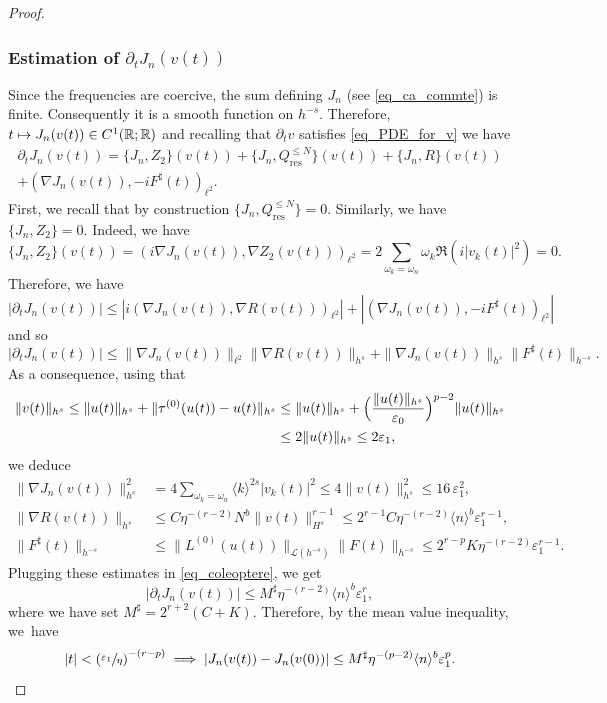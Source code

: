 \documentclass[11pt]{article}
\newcommand\mto{\mathchoice{\longmapsto}{\mapsto}{\mapsto}{\mapsto}}
\theoremstyle{definition}
\begin{document}
\begin{proof}
\subsubsection*{Estimation of $\partial_t J_n(v(t))$}
Since the frequencies are coercive, the sum defining $J_n$ (see \eqref{eq_ca_commte}) is finite. Consequently it is a smooth function on $h^{-s}$. Therefore, $t\mto J_n(v(t)) \in C^1(\mathbb{R};\mathbb{R})$ and recalling that $\partial_t v$ satisfies \eqref{eq_PDE_for_v} we have
\begin{multline*}
\partial_t J_n(v(t)) = \{J_n, Z_2 \}(v(t))+ \{J_n, Q^{\leq N}_{\mathrm{res}} \}(v(t)) + \{J_n, R \}(v(t)) \\+ (\nabla J_n(v(t)),-i F^\sharp(t))_{\ell^2}.
\end{multline*}
First, we recall that by construction $\{J_n, Q^{\leq N}_{\mathrm{res}} \}=0$. Similarly, we have $\{J_n, Z_2 \}=0$. Indeed, we have
\[
\{J_n, Z_2 \}(v(t)) = (i\nabla J_n(v(t)), \nabla Z_2(v(t)))_{\ell^2}=2 \sum_{\omega_k = \omega_n} \omega_k \Re (i |v_k(t)|^2) = 0.
\]
Therefore, we have $|\partial_t J_n(v(t))| \leq | i(\nabla J_n(v(t)),\nabla R(v(t)))_{\ell^2} | +| (\nabla J_n(v(t)),-i F^\sharp(t))_{\ell^2}|$ and so
\begin{equation}
\label{eq_coleoptere}
|\partial_t J_n(v(t))| \leq \| \nabla J_n (v(t)) \|_{\ell^2} \| \nabla R (v(t)) \|_{h^s} + \| \nabla J_n (v(t)) \|_{h^{s}} \| F^\sharp(t) \|_{h^{-s}}.
\end{equation}
As a consequence, using that
\begin{equation*}
\begin{split}
\|v(t)\|_{h^s} \leq \|u(t) \|_{h^s} + \| \tau^{(0)}(u(t)) - u(t) \|_{h^s} &\leq \|u(t) \|_{h^s} + \Bigl(\frac{\| u(t)\|_{h^s}}{\varepsilon_0} \Bigr)^{p-2} \|u(t)\|_{h^s} \\
&\leq 2 \|u(t) \|_{h^s} \leq 2\varepsilon_1,
\end{split}
\end{equation*}
we deduce
\begin{equation*}
\begin{split}
\| \nabla J_n (v(t)) \|_{h^s}^2 &= 4 \sum_{\omega_k = \omega_n} \langle k \rangle^{2s} |v_k(t)|^2 \leq 4 \| v(t) \|_{h^s}^2 \leq 16\, \varepsilon_1^2, \\
\| \nabla R (v(t)) \|_{h^s} &\leq C \eta^{-(r-2)} N^{b} \|v(t)\|_{H^s}^{r-1} \leq 2^{r-1} C \eta^{-(r-2)} \langle n\rangle^{b} \varepsilon_1^{r-1}, \\
\| F^\sharp(t) \|_{h^{-s}} &\leq \| L^{(0)}(u(t)) \|_{\mathscr{L}(h^{-s})} \| F(t) \|_{h^{-s}} \leq 2^{r-p} K \eta^{-(r-2)} \varepsilon_1^{r-1}.
\end{split}
\end{equation*}
Plugging these estimates in \eqref{eq_coleoptere}, we get
\[
|\partial_t J_n(v(t))| \leq M^\sharp \eta^{-(r-2)} \langle n \rangle^{b} \varepsilon_1^{r},
\]
where we have set $M^\sharp = 2^{r+2} (C+K)$.
Therefore, by the mean value inequality, we~have
\[
|t|< \left(\sfrac{ \varepsilon_1}{\eta} \right)^{-(r-p)} \implies |J_n(v(t)) - J_n(v(0))| \leq M^\sharp \eta^{-(p-2)} \langle n \rangle^{b} \varepsilon_1^{p}.
\]


\end{proof}
\end{document}
